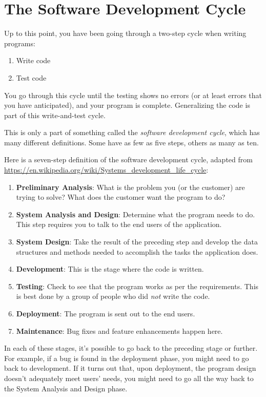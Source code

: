 \section{The Software Development Cycle}

Up to this point, you have been going through a two-step cycle when writing programs:

\begin{enumerate}
\item Write code
\item Test code
\end{enumerate}

You go through this cycle until the testing shows no errors (or at least errors that you have anticipated), and your program is complete. Generalizing the code is part of this write-and-test cycle.

This is only a part of something called the {\em software development cycle}, which has many different definitions. Some have as few as five steps, others as many as ten.

Here is a seven-step definition of the software development cycle, adapted from \url{https://en.wikipedia.org/wiki/Systems_development_life_cycle}:

\begin{enumerate}
\item {\bf Preliminary Analysis}: What is the problem you (or the customer) are trying to solve? What does the customer want the program to do?
\item {\bf System Analysis and Design}: Determine what the program needs to do. This step requires you to talk to the end users of the application.
\item {\bf System Design}: Take the result of the preceding step and develop the data structures and methods needed to accomplish the tasks the application does.
\item {\bf Development}: This is the stage where the code is written.
\item {\bf Testing}: Check to see that the program works as per the requirements. This is best done by a group of people who did {\em not} write the code.
\item {\bf Deployment}: The program is sent out to the end users. 
\item {\bf Maintenance}: Bug fixes and feature enhancements happen here.
\end{enumerate}

In each of these stages, it's possible to go back to the preceding stage or further. For example, if a bug is found in the deployment phase, you might need to go back to development. If it turns out that, upon deployment, the program design doesn't adequately meet users' needs, you might need to go all the way back to the System Analysis and Design phase.


